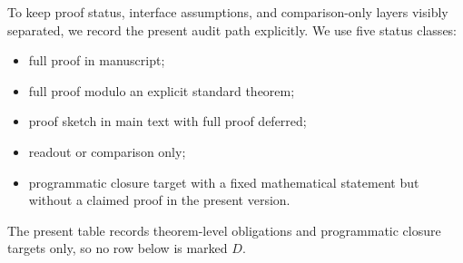 To keep proof status, interface assumptions, and comparison-only layers visibly separated, we record
the present audit path explicitly. We use five status classes:
\begin{itemize}[leftmargin=1.4em, topsep=2pt, itemsep=1pt]
    \item[$A$] full proof in manuscript;
    \item[$B$] full proof modulo an explicit standard theorem;
    \item[$C$] proof sketch in main text with full proof deferred;
    \item[$D$] readout or comparison only;
    \item[$P$] programmatic closure target with a fixed mathematical statement but without a claimed proof in the present version.
\end{itemize}
The present table records theorem-level obligations and programmatic closure targets only, so no row below is marked $D$.

